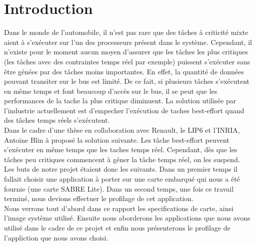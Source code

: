 \section*{Introduction}

Dans le monde de l'automobile, il n'est pas rare que des tâches à criticité 
mixte aient à s'exécuter sur l'un des processeurs présent dans le système. 
Cependant, il n'existe pour le moment aucun moyen d'assurer que les tâches les 
plus critiques (les tâches avec des contraintes temps réel par exemple) puissent
s'exécuter sans être génées par des tâches moins importantes. En effet, la 
quantité de données pouvant transiter sur le bus est limité. De ce fait, si 
plusieurs tâches s'exécutent en même temps et font beaucoup d'accès sur le bus, 
il se peut que les performances de la tache la plus critique diminuent. La 
solution utilisée par l'industrie actuellement est d'empecher l'exécution de 
taches best-effort quand des tâches temps réels s'exécutent. \\

Dans le cadre d'une thèse en collaboration avec Renault, le LIP6 et l'INRIA, 
Antoine Blin à proposé la solution suivante. Les tâche best-effort peuvent 
s'exécuter en même temps que les taches temps réel. Cependant, dès que les 
tâches peu critiques commencent à géner la tâche temps réel, on les suspend.\\

Les buts de notre projet étaient donc les suivants. Dans un premier temps
il fallait choisir une application à porter sur une carte embarqué qui nous a 
été fournie (une carte SABRE Lite). Dans un second temps, une fois ce travail 
terminé, nous devions effectuer le profilage de cet application. \\

Nous verrons tout d'abord dans ce rapport les specifications de carte, ainsi 
l'image système utilisé. Ensuite nous aborderons les applications que nous avons
utilisé dans le cadre de ce projet et enfin nous présenterons le profilage de
l'appliction que nous avons choisi.
